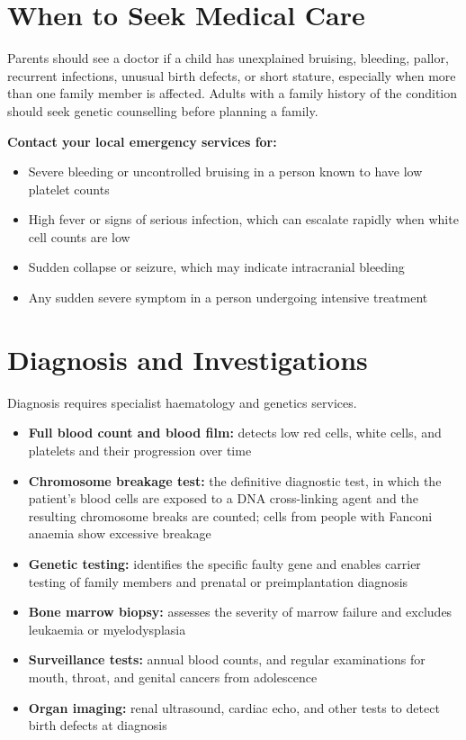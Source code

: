 \section*{When to Seek Medical Care}
Parents should see a doctor if a child has unexplained bruising, bleeding, pallor, recurrent infections, unusual birth defects, or short stature, especially when more than one family member is affected. Adults with a family history of the condition should seek genetic counselling before planning a family.

\textbf{Contact your local emergency services for:}
\begin{itemize}
    \item Severe bleeding or uncontrolled bruising in a person known to have low platelet counts
    \item High fever or signs of serious infection, which can escalate rapidly when white cell counts are low
    \item Sudden collapse or seizure, which may indicate intracranial bleeding
    \item Any sudden severe symptom in a person undergoing intensive treatment
\end{itemize}

\section*{Diagnosis and Investigations}
Diagnosis requires specialist haematology and genetics services.
\begin{itemize}
    \item \textbf{Full blood count and blood film:} detects low red cells, white cells, and platelets and their progression over time
    \item \textbf{Chromosome breakage test:} the definitive diagnostic test, in which the patient's blood cells are exposed to a DNA cross-linking agent and the resulting chromosome breaks are counted; cells from people with Fanconi anaemia show excessive breakage
    \item \textbf{Genetic testing:} identifies the specific faulty gene and enables carrier testing of family members and prenatal or preimplantation diagnosis
    \item \textbf{Bone marrow biopsy:} assesses the severity of marrow failure and excludes leukaemia or myelodysplasia
    \item \textbf{Surveillance tests:} annual blood counts, and regular examinations for mouth, throat, and genital cancers from adolescence
    \item \textbf{Organ imaging:} renal ultrasound, cardiac echo, and other tests to detect birth defects at diagnosis
\end{itemize}


